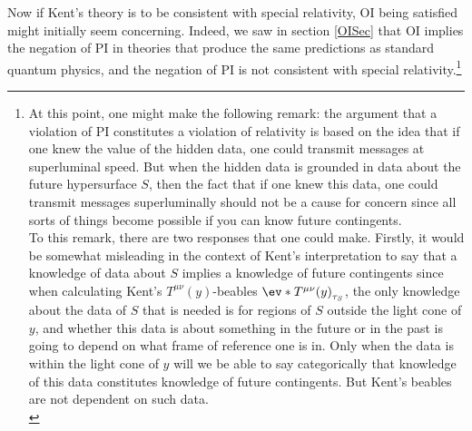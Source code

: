 \documentclass[12pt]{report}
\begin{document}
Now if Kent's theory is to be consistent with special relativity, OI being satisfied might initially seem concerning. Indeed, we saw in section \ref{OISec} that OI implies the negation of PI in theories that produce the same predictions as standard quantum physics, and the negation of PI is not consistent with special relativity.\footnote{At this point, one might make the following remark: the argument that a violation of PI constitutes a violation of relativity is based on the idea that if one knew the value of the hidden data, one could transmit messages at superluminal speed. But when the hidden data is grounded in data about the future hypersurface $S$, then the fact that if one knew this data, one could transmit messages superluminally should not be a cause for concern since all sorts of things become possible if you can know future contingents.
\vspace{1em}
\\
To this remark, there are two responses that one could make. Firstly, it would be somewhat misleading in the context of Kent's interpretation to say that a knowledge of data about $S$ implies a knowledge of future contingents since when calculating Kent's $T^{\mu\nu}(y)$-beables $\ev*{T^{\mu\nu}(y)}_{\tau_S}$, the only knowledge about the data of $S$ that is needed is for regions of $S$ outside the light cone of $y$, and whether this data is about something in the future or in the past is going to depend on what frame of reference one is in. Only when the data is within the light cone of $y$ will we be able to say categorically that knowledge of this data constitutes knowledge of future contingents. But Kent's beables are not dependent on such data.
\vspace{1em}
\\
}
\end{document}
